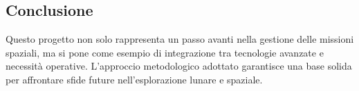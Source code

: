 \subsection*{Conclusione}

Questo progetto non solo rappresenta un passo avanti nella gestione delle missioni spaziali, ma si pone come esempio di integrazione tra tecnologie avanzate e necessità operative. L'approccio metodologico adottato garantisce una base solida per affrontare sfide future nell'esplorazione lunare e spaziale.
